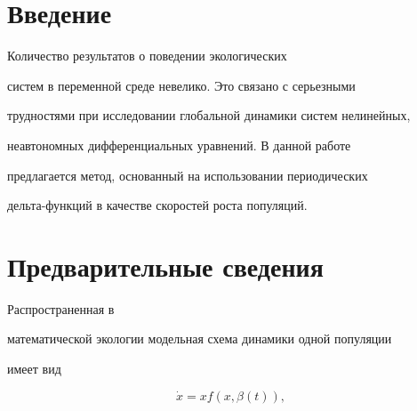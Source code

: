 \date{} 




 


\pagestyle{plain} %


 


 




 


\maketitle 


\label{begin} 


 


\section*{Введение}


Количество результатов о поведении экологических 


систем в переменной среде невелико. Это связано с серьезными 


трудностями при исследовании глобальной динамики систем нелинейных, 


неавтономных дифференциальных уравнений. В данной работе 


предлагается метод, основанный на использовании периодических 


дельта-функций в качестве скоростей роста популяций.





\section{Предварительные сведения}


Распространенная в 


математической экологии модельная схема динамики одной популяции 


имеет вид


\begin{equation}


\Dot x=xf(x,\beta(t)),


\label{1.1}


\end{equation}


